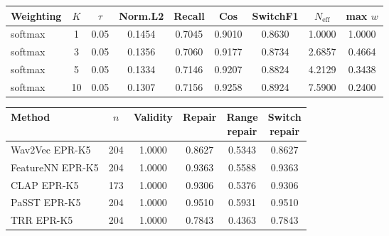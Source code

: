 \documentclass[journal,10pt]{IEEEtran}
\begin{document}
\begin{minipage}{\textwidth}
	\centering
	\label{tab:supp_epr_sensitivity}
	\label{tab:supp_epr_validity}
	\footnotesize
	\begin{tabular}{lcccccccc}
		\toprule
		\textbf{Weighting} & \textbf{$K$} & \textbf{$\tau$} & \textbf{Norm.L2} & \textbf{Recall} & \textbf{Cos} & \textbf{SwitchF1} & \textbf{$N_{\mathrm{eff}}$} & \textbf{max $w$} \\
		\midrule
		softmax & 1 & 0.05 & 0.1454 & 0.7045 & 0.9010 & 0.8630 & 1.0000 & 1.0000 \\
		softmax & 3 & 0.05 & 0.1356 & 0.7060 & 0.9177 & 0.8734 & 2.6857 & 0.4664 \\
		softmax & 5 & 0.05 & 0.1334 & 0.7146 & 0.9207 & 0.8824 & 4.2129 & 0.3438 \\
		softmax & 10 & 0.05 & 0.1307 & 0.7156 & 0.9258 & 0.8924 & 7.5900 & 0.2400 \\
		\bottomrule
	\end{tabular}
	\vspace{8pt}
	\begin{tabular}{lccccc}
		\toprule
		\textbf{Method} & \textbf{$n$} & \textbf{Validity} & \textbf{Repair} & \makecell{\textbf{Range}\\ \textbf{repair}} & \makecell{\textbf{Switch}\\ \textbf{repair}} \\
		\midrule
		Wav2Vec EPR-K5 & 204 & 1.0000 & 0.8627 & 0.5343 & 0.8627 \\
		FeatureNN EPR-K5 & 204 & 1.0000 & 0.9363 & 0.5588 & 0.9363 \\
		CLAP EPR-K5 & 173 & 1.0000 & 0.9306 & 0.5376 & 0.9306 \\
		PaSST EPR-K5 & 204 & 1.0000 & 0.9510 & 0.5931 & 0.9510 \\
		TRR EPR-K5 & 204 & 1.0000 & 0.7843 & 0.4363 & 0.7843 \\
		\bottomrule
	\end{tabular}
\end{minipage}
\end{document}
